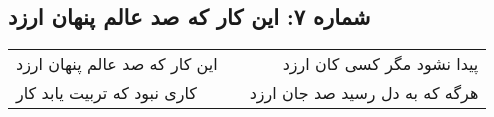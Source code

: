 \begin{center}
\section*{شماره ۷: این کار که صد عالم پنهان ارزد}
\label{sec:007}
\begin{longtable}{l p{0.5cm} r}
این کار که صد عالم پنهان ارزد
&&
پیدا نشود مگر کسی کان ارزد
\\
کاری نبود که تربیت یابد کار
&&
هرگه که به دل رسید صد جان ارزد
\\
\end{longtable}
\end{center}
